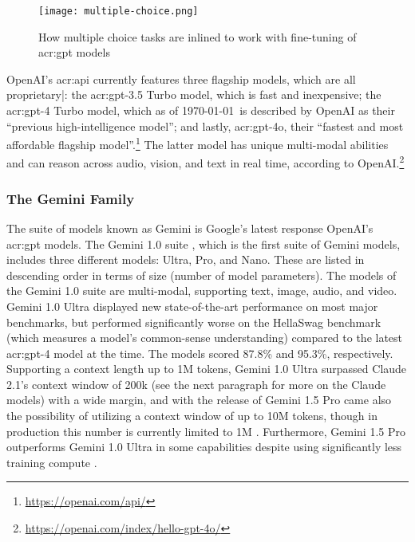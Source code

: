 \begin{figure}
    \centering
    \texttt{[image: multiple-choice.png]}
    \caption{How multiple choice tasks are inlined to work with fine-tuning of \acrshort{acr:gpt} models \citep[4]{radfordImprovingLanguageUnderstanding2018}}
    \label{fig:multiple-choice}
\end{figure}

OpenAI's \acrshort{acr:api} currently features three flagship models, which are all proprietary|: the \acrshort{acr:gpt}-3.5 Turbo model, which is fast and inexpensive; the \acrshort{acr:gpt}-4 Turbo model, which as of \today~is described by OpenAI as their \enquote{previous high-intelligence model}; and lastly, \acrshort{acr:gpt}-4o, their \enquote{fastest and most affordable flagship model}.\footnote{\url{https://openai.com/api/}} The latter model has unique multi-modal abilities and can reason across audio, vision, and text in real time, according to OpenAI.\footnote{\url{https://openai.com/index/hello-gpt-4o/}}

\subsubsection{The Gemini Family}
\label{subsubsec:gemini}

The suite of models known as Gemini is Google's latest response OpenAI's \acrshort{acr:gpt} models. The Gemini 1.0 suite \citep{geminiteamGeminiFamilyHighly2024}, which is the first suite of Gemini models, includes three different models: Ultra, Pro, and Nano. These are listed in descending order in terms of size (number of model parameters). The models of the Gemini 1.0 suite are multi-modal, supporting text, image, audio, and video. Gemini 1.0 Ultra displayed new state-of-the-art performance on most major benchmarks, but performed significantly worse on the HellaSwag benchmark (which measures a model's common-sense understanding) compared to the latest \acrshort{acr:gpt}-4 model at the time. The models scored 87.8\% and 95.3\%, respectively. Supporting a context length up to 1M tokens, Gemini 1.0 Ultra surpassed Claude 2.1's context window of 200k (see the next paragraph for more on the Claude models) with a wide margin, and with the release of Gemini 1.5 Pro came also the possibility of utilizing a context window of up to 10M tokens, though in production this number is currently limited to 1M \citep{geminiteamGeminiUnlockingMultimodal2024, pichaiOurNextgenerationModel2024}. Furthermore, Gemini 1.5 Pro outperforms Gemini 1.0 Ultra in some capabilities despite using significantly less training compute \citep[31]{geminiteamGeminiUnlockingMultimodal2024}.

